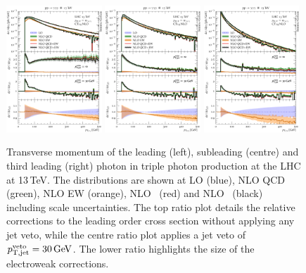 \begin{figure}[t!]
  \centering
  \includegraphics[width=0.32\textwidth]{figs_aaa/pT_y1}
  \includegraphics[width=0.32\textwidth]{figs_aaa/pT_y2}
  \includegraphics[width=0.32\textwidth]{figs_aaa/pT_y3}
  \caption{
    Transverse momentum of the leading (left), subleading (centre) 
    and third leading (right) photon 
    in triple photon production at the LHC at 13\,TeV. 
    The distributions are shown at LO (blue), NLO QCD (green), 
    NLO EW (orange), NLO \QCDpEW\ (red) and NLO \QCDtEW\ (black) 
    including scale uncertainties. The top ratio plot details 
    the relative corrections to the leading order cross section 
    without applying any jet veto, while the centre ratio plot 
    applies a jet veto of $p_\mathrm{T,jet}^\mathrm{veto}=\text{30\,GeV}$. 
    The lower ratio highlights the size of the electroweak corrections.
    \label{fig:aaa:pt}
  }
\end{figure}

